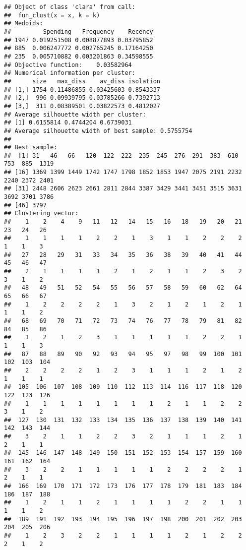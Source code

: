 \documentclass[
]{article}
\begin{document}
\begin{verbatim}
## Object of class 'clara' from call:
##  fun_clust(x = x, k = k) 
## Medoids:
##         Spending   Frequency    Recency
## 1947 0.019251508 0.008877893 0.03795852
## 885  0.006247772 0.002765245 0.17164250
## 235  0.005710882 0.003201863 0.34598555
## Objective function:    0.03582964 
## Numerical information per cluster:
##      size   max_diss    av_diss isolation
## [1,] 1754 0.11486855 0.03425603 0.8543337
## [2,]  996 0.09939795 0.03785266 0.7392713
## [3,]  311 0.08389501 0.03822573 0.4812027
## Average silhouette width per cluster:
## [1] 0.6155814 0.4744204 0.6739031
## Average silhouette width of best sample: 0.5755754 
## 
## Best sample:
##  [1] 31   46   66   120  122  222  235  245  276  291  383  610  753  885  1319
## [16] 1369 1399 1449 1742 1747 1798 1852 1853 1947 2075 2191 2232 2240 2372 2401
## [31] 2448 2606 2623 2661 2811 2844 3387 3429 3441 3451 3515 3631 3692 3701 3786
## [46] 3797
## Clustering vector:
##    1    2    4    9   11   12   14   15   16   18   19   20   21   23   24   26 
##    1    1    1    1    2    2    1    3    1    1    2    2    2    1    1    3 
##   27   28   29   31   33   34   35   36   38   39   40   41   44   45   46   47 
##    2    1    1    1    1    2    1    2    1    1    2    3    2    3    1    2 
##   48   49   51   52   54   55   56   57   58   59   60   62   64   65   66   67 
##    1    2    2    2    2    1    3    2    1    2    1    2    1    1    1    2 
##   68   69   70   71   72   73   74   76   77   78   79   81   82   84   85   86 
##    1    2    1    2    3    1    1    1    1    1    2    2    1    1    1    3 
##   87   88   89   90   92   93   94   95   97   98   99  100  101  102  103  104 
##    2    2    2    2    1    2    3    1    1    1    2    1    2    1    1    1 
##  105  106  107  108  109  110  112  113  114  116  117  118  120  122  123  126 
##    1    1    1    1    1    1    1    1    2    1    1    2    2    3    1    2 
##  127  130  131  132  133  134  135  136  137  138  139  140  141  142  143  144 
##    3    2    1    1    2    2    3    2    1    1    1    2    1    2    1    1 
##  145  146  147  148  149  150  151  152  153  154  157  159  160  161  162  164 
##    3    2    2    1    1    1    1    1    2    2    2    2    1    2    1    1 
##  166  169  170  171  172  173  176  177  178  179  181  183  184  186  187  188 
##    1    2    1    1    2    1    1    1    1    2    2    1    1    1    1    2 
##  189  191  192  193  194  195  196  197  198  200  201  202  203  204  205  206 
##    1    2    3    2    2    1    1    1    1    2    1    2    2    2    1    2 

\end{verbatim}
\end{document}
